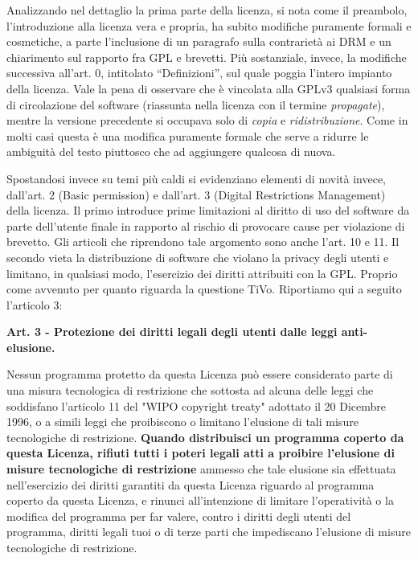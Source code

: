 Analizzando nel dettaglio la prima parte della licenza, si nota come il preambolo, l’introduzione alla licenza vera e propria, ha subito modifiche puramente formali e cosmetiche, a parte l’inclusione di un paragrafo sulla contrarietà ai DRM e un chiarimento sul rapporto fra GPL e brevetti.
Più sostanziale, invece, la modifiche successiva all'art. 0, intitolato “Definizioni”, sul quale poggia l’intero impianto della licenza. Vale la pena di osservare che è vincolata alla GPLv3 qualsiasi forma di circolazione del software (riassunta nella licenza con il termine \textit{propagate}), mentre la versione precedente si occupava solo di \textit{copia} e \textit{ridistribuzione}. Come in molti casi questa è una modifica puramente formale che serve a ridurre le ambiguità del testo piuttosco che ad aggiungere qualcosa di nuova.

Spostandosi invece su temi più caldi si evidenziano elementi di novità invece, dall’art. 2 (Basic permission) e dall’art. 3 (Digital Restrictions Management) della licenza.
Il primo introduce prime limitazioni al diritto di uso del software da parte dell’utente finale in rapporto al rischio di provocare cause per violazione di brevetto. Gli articoli che riprendono tale argomento sono anche l'art. 10 e 11.
Il secondo vieta la distribuzione di software che violano la privacy degli utenti e limitano, in qualsiasi modo, l’esercizio dei diritti attribuiti con la GPL. Proprio come avvenuto per quanto riguarda la questione TiVo.
Riportiamo qui a seguito l'articolo 3:\\


\begin{scriptsize}

\textbf{Art. 3 - Protezione dei diritti legali degli utenti dalle leggi anti-elusione.}

Nessun programma protetto da questa Licenza può essere considerato parte di una misura tecnologica di restrizione che sottosta ad alcuna delle leggi che soddisfano l'articolo 11 del "WIPO copyright treaty" adottato il 20 Dicembre 1996, o a simili leggi che proibiscono o limitano l'elusione di tali misure tecnologiche di restrizione.
\textbf{Quando distribuisci un programma coperto da questa Licenza, rifiuti tutti i poteri legali atti a proibire l'elusione di misure tecnologiche di restrizione} ammesso che tale elusione sia effettuata nell'esercizio dei diritti garantiti da questa Licenza riguardo al programma coperto da questa Licenza, e rinunci all'intenzione di limitare l'operatività o la modifica del programma per far valere, contro i diritti degli utenti del programma, diritti legali tuoi o di terze parti che impediscano l'elusione di misure tecnologiche di restrizione.\\
\end{scriptsize}


